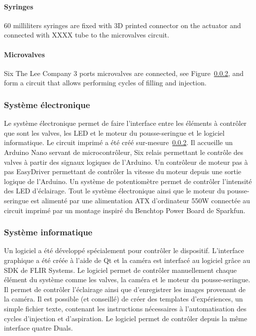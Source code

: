   \paragraph{Syringes} 60 milliliters syringes are fixed with 3D printed connector on the actuator and connected with XXXX tube to the microvalves circuit.

  \paragraph{Microvalves} Six The Lee Company 3 ports microvalves are connected, see Figure~\ref{}, and form a circuit that allows performing cycles of filling and injection.

  \subsubsection{Système électronique}
  Le système électronique permet de faire l'interface entre les éléments à contrôler que sont les valves, les LED et le moteur du pousse-seringue et le logiciel informatique. Le circuit imprimé a été créé sur-mesure~\ref{}. Il accueille un Arduino Nano servant de microcontrôleur, Six relais permettant le contrôle des valves à partir des signaux logiques de l'Arduino. Un contrôleur de moteur pas à pas EasyDriver permettant de contrôler la vitesse du moteur depuis une sortie logique de l'Arduino. Un système de potentiomètre permet de contrôler l'intensité des LED d'éclairage. Tout le système électronique ainsi que le moteur du pousse-seringue est alimenté par une alimentation ATX d'ordinateur 550W connectée au circuit imprimé par un montage inspiré du Benchtop Power Board de Sparkfun.
  \subsubsection{Système informatique}
  Un logiciel a été développé spécialement pour contrôler le dispositif. L'interface graphique a été créée à l'aide de Qt et la caméra est interfacé au logiciel grâce au SDK de FLIR Systems. Le logiciel permet de contrôler manuellement chaque élément du système comme les valves, la caméra et le moteur du pousse-seringue. Il permet de contrôler l'éclairage ainsi que d'enregistrer les images provenant de la caméra. Il est possible (et conseillé) de créer des templates d'expériences, un simple fichier texte, contenant les instructions nécessaires à l'automatisation des cycles d'injection et d'aspiration. Le logiciel permet de contrôler depuis la même interface quatre Duals.
